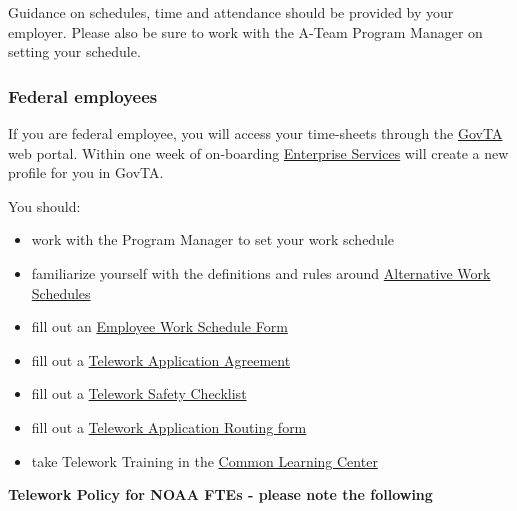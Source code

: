 \documentclass[
  letterpaper,
  DIV=11,
  numbers=noendperiod]{scrreprt}
\providecommand{\tightlist}{%
  \setlength{\itemsep}{0pt}\setlength{\parskip}{0pt}}\usepackage{longtable,booktabs,array}
\begin{document}
Guidance on schedules, time and attendance should be provided by your
employer. Please also be sure to work with the A-Team Program Manager on
setting your schedule.

\subsubsection{Federal employees}\label{federal-employees}

If you are federal employee, you will access your time-sheets through
the \href{https://docwebta.eas.commerce.gov/webta/}{GovTA} web portal.
Within one week of on-boarding
\href{https://enterpriseservices.servicenowservices.com/es}{Enterprise
Services} will create a new profile for you in GovTA.

You should:

\begin{itemize}
\tightlist
\item
  work with the Program Manager to set your work schedule\\
\item
  familiarize yourself with the definitions and rules around
  \href{https://drive.google.com/file/d/1VlxkCEHZEdQd2pfGu9Bud5QZDUudqioa/view?pli=1}{Alternative
  Work Schedules}\\
\item
  fill out an
  \href{https://drive.google.com/file/d/1SvyTE2M6lQ0dcX5w3b0f7CJNxU6zDFDy/view?usp=share_link}{Employee
  Work Schedule Form}\\
\item
  fill out a
  \href{https://drive.google.com/file/d/19oABvmjMgRX4az-9U1Ijgd3ux5BwmHQw/view}{Telework
  Application Agreement}\\
\item
  fill out a
  \href{https://drive.google.com/file/d/198EkLWjTkQIOVQ1z7eD9eBf5z74Orfah/view}{Telework
  Safety Checklist}
\item
  fill out a
  \href{https://docs.google.com/forms/d/e/1FAIpQLSchGHo2aulpw4md1jFiEAnAtQ9NS-idmG9gJ_ngqlB-MQj3_w/viewform}{Telework
  Application Routing form}
\item
  take Telework Training in the
  \href{https://doc.csod.com/client/doc/default.aspx}{Common Learning
  Center}
\end{itemize}

\textbf{Telework Policy for NOAA FTEs - please note the following}
\end{document}
